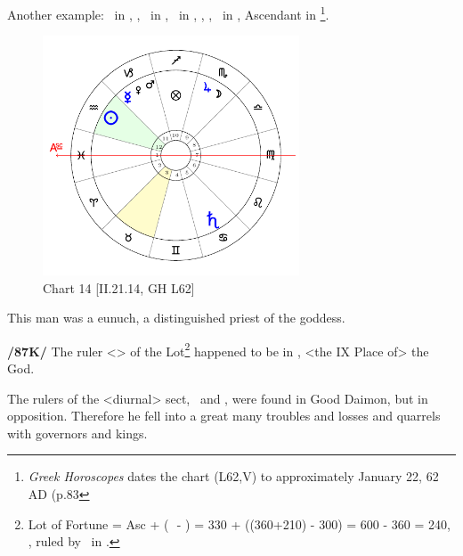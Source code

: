 Another example: \Sun\, in \Aquarius, \Moon, \Jupiter\, in \Scorpio, \Saturn\, in \Cancer, \Mars, \Venus, \Mercury\, in \Capricorn, Ascendant in \Pisces
\footnote{\textit{Greek Horoscopes} dates the chart (L62,V) to approximately January 22, 62 AD (p.83}.

\clearpage
\begin{figure}
\centering
\vspace{-20pt}
\includegraphics[width=0.68\textwidth]{charts/2_21_14}
\caption{Chart 14 [II.21.14, GH L62]}
\label{fig:chart14}
\end{figure}

This man was a eunuch, a distinguished priest of the goddess. 

\textbf{/87K/} The ruler <\Jupiter> of the Lot\footnote{Lot of Fortune = Asc + (\Moon\,\, - \Sun) = 330 + ((360+210) - 300) = 600 - 360 = 240, \Sagittarius, ruled by \Jupiter\, in \Scorpio.}
 happened to be in \Scorpio, <the IX Place of> the God. 
 
 The rulers of the <diurnal> sect, \Saturn\, and \Mercury, were found in Good Daimon, but in opposition. Therefore he fell into a great many troubles and losses and quarrels with governors and kings.

\newpage